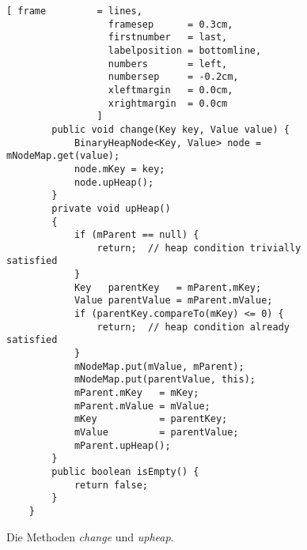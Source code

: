 \begin{figure}[!ht]
  \centering
\begin{Verbatim}[ frame         = lines, 
                  framesep      = 0.3cm, 
                  firstnumber   = last,
                  labelposition = bottomline,
                  numbers       = left,
                  numbersep     = -0.2cm,
                  xleftmargin   = 0.0cm,
                  xrightmargin  = 0.0cm
                ]
        public void change(Key key, Value value) {
            BinaryHeapNode<Key, Value> node = mNodeMap.get(value);
            node.mKey = key;
            node.upHeap();
        }
        private void upHeap() 
        {
            if (mParent == null) {
                return;  // heap condition trivially satisfied
            }
            Key   parentKey   = mParent.mKey;
            Value parentValue = mParent.mValue;
            if (parentKey.compareTo(mKey) <= 0) {
                return;  // heap condition already satisfied
            }
            mNodeMap.put(mValue, mParent);
            mNodeMap.put(parentValue, this);
            mParent.mKey   = mKey;
            mParent.mValue = mValue;
            mKey           = parentKey;
            mValue         = parentValue;
            mParent.upHeap();
        }    
        public boolean isEmpty() {
            return false;
        }
    }
\end{Verbatim}
\vspace*{-0.3cm}
  \caption{Die Methoden \textsl{change} und \textsl{upheap}.}
  \label{fig:BinaryHeapNode-change}
\end{figure}

